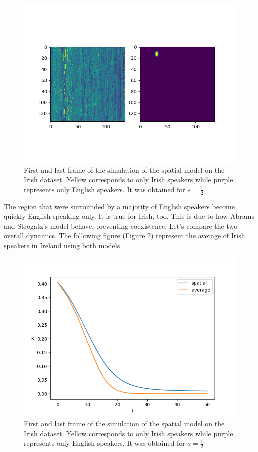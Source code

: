 \documentclass{article}
\begin{document}
\begin{figure}[H]
\centering
\includegraphics[scale=0.5]{firstandlast_ir.png}
\caption{First and last frame of the simulation of the spatial model on the Irish dataset. Yellow corresponds to only Irish speakers while purple represents only English speakers. It was obtained for $s=\frac{1}{2}$}
\label{fig:firstandlast_ir}
\end{figure}

The region that were surrounded by a majority of English speakers become quickly English speaking only.
It is true for Irish, too.
This is due to how Abrams and Strogatz's model behave, preventing coexistence.
Let's compare the two overall dynamics.
The following figure (Figure \ref{fig:overall}) represent the average of Irish speakers in Ireland using both models

\begin{figure}[H]
\centering
\includegraphics[scale=0.5]{overall_dyn_ir.png}
\caption{First and last frame of the simulation of the spatial model on the Irish dataset. Yellow corresponds to only Irish speakers while purple represents only English speakers. It was obtained for $s=\frac{1}{2}$}
\label{fig:overall}
\end{figure}
\end{document}

